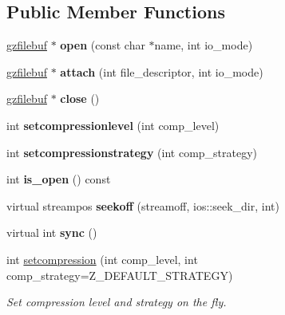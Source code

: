 \subsection*{Public Member Functions}
\begin{DoxyCompactItemize}
\item 
\mbox{\label{classgzfilebuf_ae1fbc989b2dae79dba798556542c147c}} 
\hyperlink{classgzfilebuf}{gzfilebuf} $\ast$ {\bfseries open} (const char $\ast$name, int io\+\_\+mode)
\item 
\mbox{\label{classgzfilebuf_a3ececdeaa35a8b606182cc23c9908891}} 
\hyperlink{classgzfilebuf}{gzfilebuf} $\ast$ {\bfseries attach} (int file\+\_\+descriptor, int io\+\_\+mode)
\item 
\mbox{\label{classgzfilebuf_a18e628926f455f41d7715c2ddd9c0e64}} 
\hyperlink{classgzfilebuf}{gzfilebuf} $\ast$ {\bfseries close} ()
\item 
\mbox{\label{classgzfilebuf_a8bbfda3e29baf20e4330e3a9d7ee4a54}} 
int {\bfseries setcompressionlevel} (int comp\+\_\+level)
\item 
\mbox{\label{classgzfilebuf_a47d4b9f1257fd12dd21847b71ad1d49d}} 
int {\bfseries setcompressionstrategy} (int comp\+\_\+strategy)
\item 
\mbox{\label{classgzfilebuf_af2619b96e3ddea9050be70dd21de4752}} 
int {\bfseries is\+\_\+open} () const
\item 
\mbox{\label{classgzfilebuf_a0ab89070031cbc37679365582180ae3c}} 
virtual streampos {\bfseries seekoff} (streamoff, ios\+::seek\+\_\+dir, int)
\item 
\mbox{\label{classgzfilebuf_ae537a3f86b37de7bf27d2aff0cded07e}} 
virtual int {\bfseries sync} ()
\item 
int \hyperlink{classgzfilebuf_ad109ea4fc4ca7cc19d8014b53375255d}{setcompression} (int comp\+\_\+level, int comp\+\_\+strategy=Z\+\_\+\+D\+E\+F\+A\+U\+L\+T\+\_\+\+S\+T\+R\+A\+T\+E\+GY)
\begin{DoxyCompactList}\small\item\em Set compression level and strategy on the fly. \end{DoxyCompactList}\item 

\end{DoxyCompactItemize}
